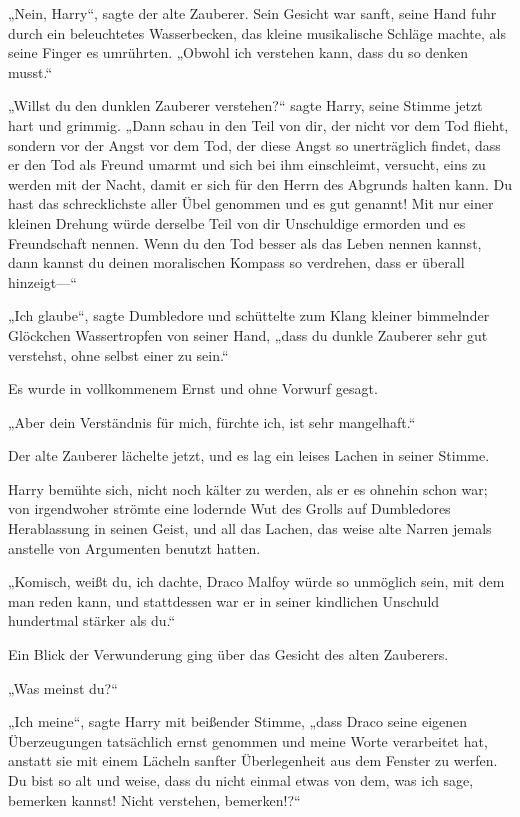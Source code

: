 {„Nein, Harry“, sagte der alte Zauberer. Sein Gesicht war sanft, seine Hand fuhr durch ein beleuchtetes Wasserbecken, das kleine musikalische Schläge machte, als seine Finger es umrührten. „Obwohl ich verstehen kann, dass du so denken musst.“

„Willst du den dunklen Zauberer verstehen?“ sagte Harry, seine Stimme jetzt hart und grimmig. „Dann schau in den Teil von dir, der nicht vor dem Tod flieht, sondern vor der Angst vor dem Tod, der diese Angst so unerträglich findet, dass er den Tod als Freund umarmt und sich bei ihm einschleimt, versucht, eins zu werden mit der Nacht, damit er sich für den Herrn des Abgrunds halten kann. Du hast das schrecklichste aller Übel genommen und es gut genannt! Mit nur einer kleinen Drehung würde derselbe Teil von dir Unschuldige ermorden und es Freundschaft nennen. Wenn du den Tod besser als das Leben nennen kannst, dann kannst du deinen moralischen Kompass so verdrehen, dass er überall hinzeigt—“

„Ich glaube“, sagte Dumbledore und schüttelte zum Klang kleiner bimmelnder Glöckchen Wassertropfen von seiner Hand, „dass du dunkle Zauberer sehr gut verstehst, ohne selbst einer zu sein.“

Es wurde in vollkommenem Ernst und ohne Vorwurf gesagt.

„Aber dein Verständnis für mich, fürchte ich, ist sehr mangelhaft.“

Der alte Zauberer lächelte jetzt, und es lag ein leises Lachen in seiner Stimme.

Harry bemühte sich, nicht noch kälter zu werden, als er es ohnehin schon war; von irgendwoher strömte eine lodernde Wut des Grolls auf Dumbledores Herablassung in seinen Geist, und all das Lachen, das weise alte Narren jemals anstelle von Argumenten benutzt hatten.

„Komisch, weißt du, ich dachte, Draco Malfoy würde so unmöglich sein, mit dem man reden kann, und stattdessen war er in seiner kindlichen Unschuld hundertmal stärker als du.“

Ein Blick der Verwunderung ging über das Gesicht des alten Zauberers.

„Was meinst du?“

„Ich meine“, sagte Harry mit beißender Stimme, „dass Draco seine eigenen Überzeugungen tatsächlich ernst genommen und meine Worte verarbeitet hat, anstatt sie mit einem Lächeln sanfter Überlegenheit aus dem Fenster zu werfen. Du bist so alt und weise, dass du nicht einmal etwas von dem, was ich sage, bemerken kannst! Nicht verstehen, bemerken!?“

}
